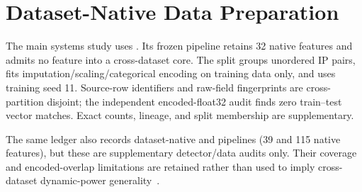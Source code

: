 \section{Dataset-Native Data Preparation}
The main systems study uses \ton{}. Its frozen pipeline retains 32 native features and admits no feature into a cross-dataset core. The \ton{} split groups unordered IP pairs, fits imputation/scaling/categorical encoding on training data only, and uses training seed 11. Source-row identifiers and raw-field fingerprints are cross-partition disjoint; the independent encoded-float32 audit finds zero \ton{} train--test vector matches. Exact counts, lineage, and split membership are supplementary.

The same ledger also records dataset-native \cic{} and \nb{} pipelines (39 and 115 native features), but these are supplementary detector/data audits only. Their coverage and encoded-overlap limitations are retained rather than used to imply cross-dataset dynamic-power generality~\cite{CICSource}.
